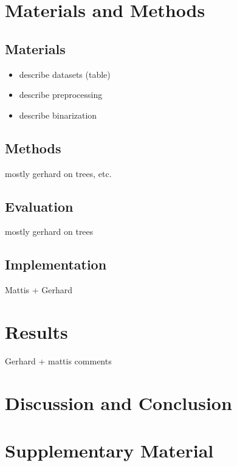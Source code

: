 \documentclass[10pt, a4paper]{article}
\begin{document}
\section{Materials and Methods}

\subsection{Materials}

\begin{itemize}
\item describe datasets (table)
\item describe preprocessing 
\item describe binarization 
\end{itemize}


\subsection{Methods}

mostly gerhard on trees, etc.

\subsection{Evaluation}

mostly gerhard on trees

\subsection{Implementation}

Mattis + Gerhard

\section{Results}

Gerhard + mattis comments

\section{Discussion and Conclusion}

\section{Supplementary Material}









\newpage
\end{document}
